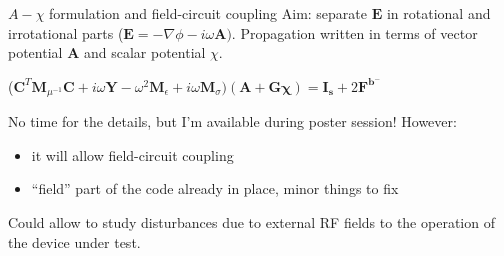 \documentclass{beamer}
\begin{document}
\begin{frame}{$A-\chi$ formulation and field-circuit coupling}
    \small
    Aim: separate $\mathbf{E}$ in rotational and irrotational parts ($\mathbf{E} = -\nabla\phi - i\omega\mathbf{A})$. Propagation written in terms of vector potential $\mathbf{A}$ and scalar potential $\chi$.

    \begin{center}
        ($\mathbf{C}^T\mathbf{M}_{\mu^{-1}}\mathbf{C} + i\omega\mathbf{Y} - \omega^2\mathbf{M}_{\epsilon} + i\omega\mathbf{M}_{\sigma})(\mathbf{A} + \mathbf{G\chi}) = \mathbf{I_s} + 2\mathbf{F^{b^-}}$
    \end{center}
    
    No time for the details, but I'm available during poster session! However:
    \begin{itemize}
        \item it will allow field-circuit coupling
        \item ``field'' part of the code already in place, minor things to fix
    \end{itemize}

    \vfill
    Could allow to study disturbances due to external RF fields to the operation of the device under test.

\end{frame}
\end{document}
